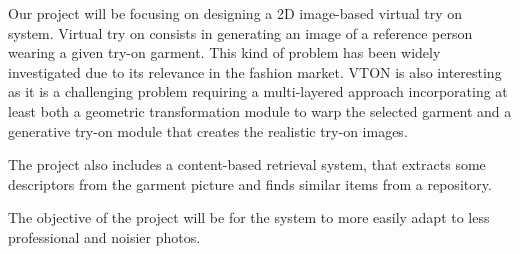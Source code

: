 Our project will be focusing on designing a 2D image-based virtual try on system. Virtual try on consists in generating an image of a reference person wearing a given try-on garment. This kind of problem has been widely investigated due to its relevance in the fashion market. VTON is also interesting as it is a challenging problem requiring a multi-layered approach incorporating at least both a geometric transformation module to warp the selected garment and a generative try-on module that creates the realistic try-on images.

The project also includes a content-based retrieval system, that extracts some descriptors from the garment picture and finds similar items from a repository.

The objective of the project will be for the system to more easily adapt to less professional and noisier photos.